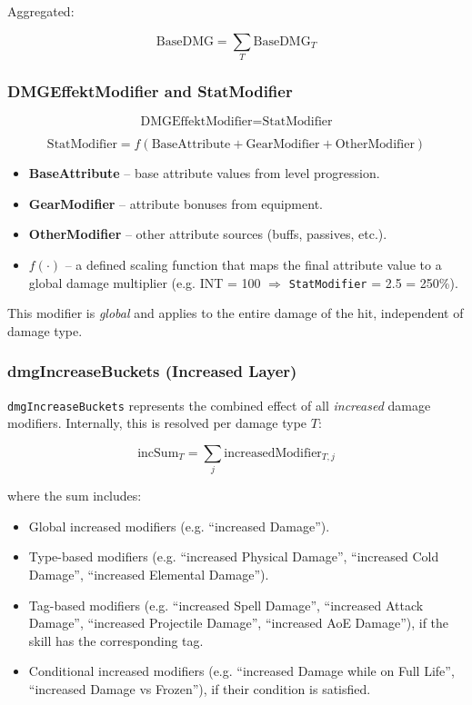 Aggregated:

\[
\text{BaseDMG} = \sum_T \text{BaseDMG}_T
\]

\subsubsection{DMGEffektModifier and StatModifier}

\[
\text{DMGEffektModifier} = \text{StatModifier}
\]

\[
\text{StatModifier} = f(\text{BaseAttribute} + \text{GearModifier} + \text{OtherModifier})
\]

\begin{itemize}
	\item \textbf{BaseAttribute} – base attribute values from level progression.
	\item \textbf{GearModifier} – attribute bonuses from equipment.
	\item \textbf{OtherModifier} – other attribute sources (buffs, passives, etc.).
	\item $f(\cdot)$ – a defined scaling function that maps the final attribute value to a global damage multiplier
	(e.g. INT = 100 $\Rightarrow$ \texttt{StatModifier} = 2.5 = 250\%).
\end{itemize}

This modifier is \emph{global} and applies to the entire damage of the hit, independent of damage type.

\subsubsection{dmgIncreaseBuckets (Increased Layer)}

\texttt{dmgIncreaseBuckets} represents the combined effect of all \emph{increased} damage modifiers. Internally, this is resolved per damage type $T$:

\[
\text{incSum}_T = \sum_j \text{increasedModifier}_{T,j}
\]

where the sum includes:

\begin{itemize}
	\item Global increased modifiers (e.g. ``increased Damage'').
	\item Type-based modifiers (e.g. ``increased Physical Damage'', ``increased Cold Damage'', ``increased Elemental Damage'').
	\item Tag-based modifiers (e.g. ``increased Spell Damage'', ``increased Attack Damage'',
	``increased Projectile Damage'', ``increased AoE Damage''), if the skill has the corresponding tag.
	\item Conditional increased modifiers (e.g. ``increased Damage while on Full Life'', ``increased Damage vs Frozen''),
	if their condition is satisfied.
\end{itemize}

